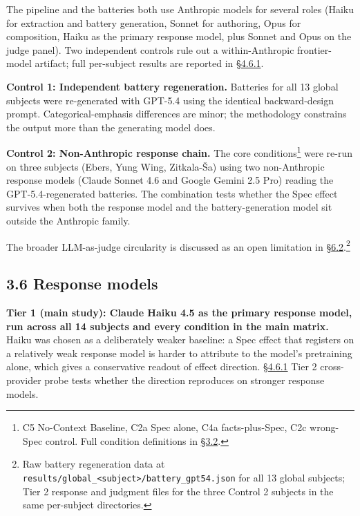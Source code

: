 The pipeline and the batteries both use Anthropic models for several
roles (Haiku for extraction and battery generation, Sonnet for
authoring, Opus for composition, Haiku as the primary response model,
plus Sonnet and Opus on the judge panel). Two independent controls rule
out a within-Anthropic frontier-model artifact; full per-subject results
are reported in \hyperref[cross-provider-response-generation-tier-2-replication]{§4.6.1}.

\textbf{Control 1: Independent battery regeneration.} Batteries for all
13 global subjects were re-generated with GPT-5.4 using the identical
backward-design prompt. Categorical-emphasis differences are minor; the
methodology constrains the output more than the generating model does.

\textbf{Control 2: Non-Anthropic response chain.} The core
conditions\footnote{C5 No-Context Baseline, C2a Spec alone, C4a
  facts-plus-Spec, C2c wrong-Spec control. Full condition definitions in
  \hyperref[experimental-conditions]{§3.2}.} were re-run on three subjects (Ebers, Yung Wing, Zitkala-Ša)
using two non-Anthropic response models (Claude Sonnet 4.6 and Google
Gemini 2.5 Pro) reading the GPT-5.4-regenerated batteries. The
combination tests whether the Spec effect survives when both the
response model and the battery-generation model sit outside the
Anthropic family.

The broader LLM-as-judge circularity is discussed as an open limitation
in \hyperref[measurement-apparatus]{§6.2}.\footnote{Raw battery regeneration data at
  \texttt{results/global\_\textless{}subject\textgreater{}/battery\_gpt54.json}
  for all 13 global subjects; Tier 2 response and judgment files for the
  three Control 2 subjects in the same per-subject directories.}

\hypertarget{response-models}{%
\subsection{3.6 Response models}\label{response-models}}

\textbf{Tier 1 (main study): Claude Haiku 4.5 as the primary response
model, run across all 14 subjects and every condition in the main
matrix.} Haiku was chosen as a deliberately weaker baseline: a Spec
effect that registers on a relatively weak response model is harder to
attribute to the model's pretraining alone, which gives a conservative
readout of effect direction. \hyperref[cross-provider-response-generation-tier-2-replication]{§4.6.1} Tier 2 cross-provider probe tests
whether the direction reproduces on stronger response models.

